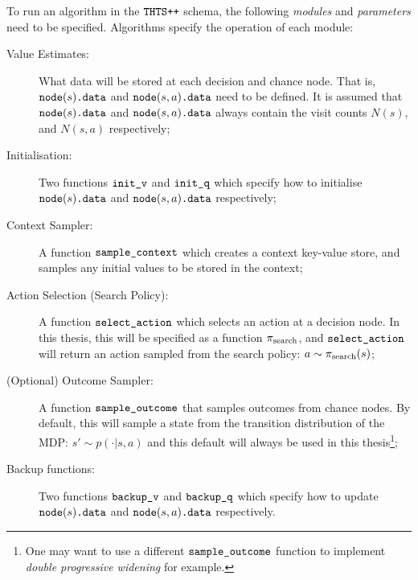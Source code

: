     To run an algorithm in the ${\textnormal{\texttt{THTS++}}}$ schema, the following \textit{modules} and \textit{parameters} need to be specified. Algorithms specify the operation of each module:
    \begin{description}
        \item[Value Estimates:]
            What data will be stored at each decision and chance node. That is, ${{\textnormal{\texttt{node}}}(s)\textnormal{\texttt{.data}}}$ and ${{\textnormal{\texttt{node}}}(s,a)\textnormal{\texttt{.data}}}$ need to be defined. It is assumed that ${{\textnormal{\texttt{node}}}(s)\textnormal{\texttt{.data}}}$ and ${{\textnormal{\texttt{node}}}(s,a)\textnormal{\texttt{.data}}}$ always contain the visit counts $N(s)$, and $N(s,a)$ respectively;
        \item[Initialisation:]
            Two functions ${\textnormal{\texttt{init\_v}}}$ and ${\textnormal{\texttt{init\_q}}}$ which specify how to initialise ${{\textnormal{\texttt{node}}}(s)\textnormal{\texttt{.data}}}$ and ${{\textnormal{\texttt{node}}}(s,a)\textnormal{\texttt{.data}}}$ respectively;
        \item[Context Sampler:]
            A function ${\textnormal{\texttt{sample\_context}}}$ which creates a context key-value store, and samples any initial values to be stored in the context;
        \item[Action Selection (Search Policy):]
            A function ${\textnormal{\texttt{select\_action}}}$ which selects an action at a decision node. In this thesis, this will be specified as a function ${\pi_{\textnormal{search}}}$, and ${\textnormal{\texttt{select\_action}}}$ will return an action sampled from the search policy: $a\sim{\pi_{\textnormal{search}}}(s)$;
        \item[(Optional) Outcome Sampler:]
            A function ${\textnormal{\texttt{sample\_outcome}}}$ that samples outcomes from chance nodes. By default, this will sample a state from the transition distribution of the MDP: $s'\sim p(\cdot|s,a)$ and this default will always be used in this thesis\footnote{One may want to use a different ${\textnormal{\texttt{sample\_outcome}}}$ function to implement \textit{double progressive widening} \cite{progressive_widen} for example.};
        \item[Backup functions:]
            Two functions ${\textnormal{\texttt{backup\_v}}}$ and ${\textnormal{\texttt{backup\_q}}}$ which specify how to update ${{\textnormal{\texttt{node}}}(s)\textnormal{\texttt{.data}}}$ and ${{\textnormal{\texttt{node}}}(s,a)\textnormal{\texttt{.data}}}$ respectively.
    \end{description}
    
